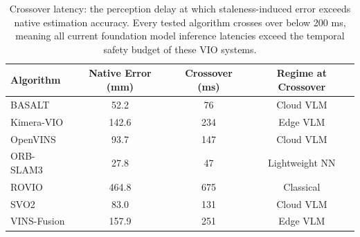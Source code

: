 \begin{table}[t]
\centering
\caption{Crossover latency: the perception delay at which staleness-induced error exceeds native estimation accuracy. Every tested algorithm crosses over below 200 ms, meaning all current foundation model inference latencies exceed the temporal safety budget of these VIO systems.}
\label{tab:crossover}
\begin{tabular}{@{}lccc@{}}
\toprule
\textbf{Algorithm} & \textbf{Native Error (mm)} & \textbf{Crossover (ms)} & \textbf{Regime at Crossover} \\
\midrule
BASALT & 52.2 & 76 & Cloud VLM \\
Kimera-VIO & 142.6 & 234 & Edge VLM \\
OpenVINS & 93.7 & 147 & Cloud VLM \\
ORB-SLAM3 & 27.8 & 47 & Lightweight NN \\
ROVIO & 464.8 & 675 & Classical \\
SVO2 & 83.0 & 131 & Cloud VLM \\
VINS-Fusion & 157.9 & 251 & Edge VLM \\
\bottomrule
\end{tabular}
\end{table}
